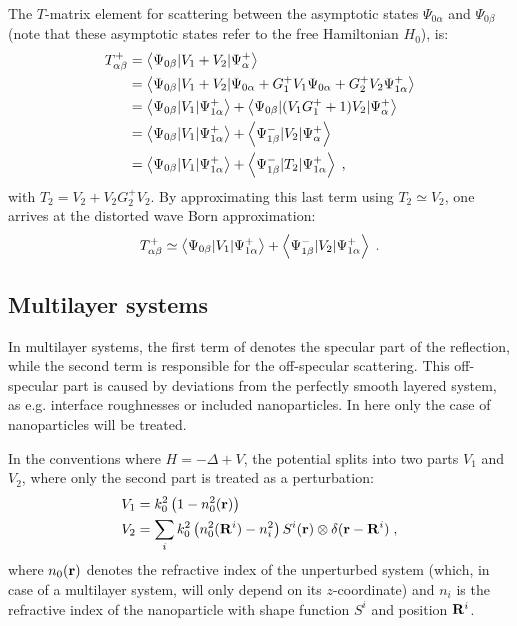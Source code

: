The $T$-matrix element for scattering between the asymptotic states $\Psi_{0\alpha}$ and $\Psi_{0\beta}$ (note that these asymptotic states refer to the free Hamiltonian $H_0$), is:
\begin{align*}
  T^+_{\alpha\beta} &= \left\langle \Psi_{0\beta} \vert V_1+V_2 \vert \Psi^+_\alpha \right\rangle \nonumber \\
  & = \left\langle \Psi_{0\beta} \vert V_1+V_2 \vert \Psi_{0\alpha} + G^+_1V_1\Psi_{0\alpha} + G^+_2V_2\Psi^+_{1\alpha} \right\rangle \nonumber \\
  & = \left\langle \Psi_{0\beta} \vert V_1 \vert \Psi^+_{1\alpha} \right\rangle + \left\langle \Psi_{0\beta} \vert (V_1G^+_1 + 1)V_2 \vert \Psi^+_\alpha \right\rangle \\
  & = \left\langle \Psi_{0\beta} \vert V_1 \vert \Psi^+_{1\alpha} \right\rangle + \left\langle \Psi^-_{1\beta} \vert V_2 \vert \Psi^+_\alpha \right\rangle \nonumber \\
  & = \left\langle \Psi_{0\beta} \vert V_1 \vert \Psi^+_{1\alpha} \right\rangle + \left\langle \Psi^-_{1\beta} \vert T_2 \vert \Psi^+_{1\alpha} \right\rangle \; ,
\end{align*}
with $T_2 = V_2 + V_2G^+_2V_2$. By approximating this last term using $T_2 \simeq V_2$, one arrives at the distorted wave Born approximation:
\begin{equation}
  \label{eq:tdwba}
   T^+_{\alpha\beta} \simeq \left\langle \Psi_{0\beta} \vert V_1 \vert \Psi^+_{1\alpha} \right\rangle + \left\langle \Psi^-_{1\beta} \vert V_2 \vert \Psi^+_{1\alpha} \right\rangle \; .
\end{equation}


\subsection{Multilayer systems}

In multilayer systems, the first term of  denotes the specular part of the reflection, while the second term is responsible for the off-specular scattering. This off-specular part is caused by deviations from the perfectly smooth layered system, as e.g. interface roughnesses or included nanoparticles. In here only the case of nanoparticles will be treated.

In the conventions where $H=-\Delta + V$, the potential splits into two parts $V_1$ and $V_2$, where only the second part is treated as a perturbation:
\begin{align*}
  V_1 & = k_0^2\left( 1-n_0^2(\mathbf{r})\right)  \\
  V_2 & = \sum_i k_0^2\left( n_0^2(\mathbf{R}^i) - n_i^2 \right) S^i(\mathbf{r}) \otimes \delta(\mathbf{r}-\mathbf{R}^i) \; ,
\end{align*}
where $n_0(\mathbf{r})$ denotes the refractive index of the unperturbed system (which, in case of a multilayer system, will only depend on its $z$-coordinate) and $n_i$ is the refractive index of the nanoparticle with shape function $S^i$ and position $\mathbf{R}^i$.

